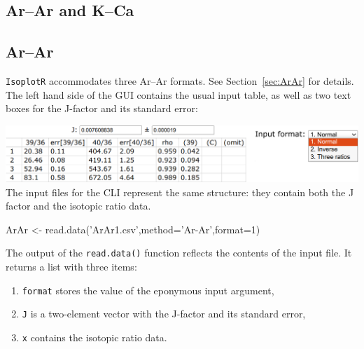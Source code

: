 \begin{refsection}

\chapter{Ar--Ar and K--Ca}
\label{ch:ArArKCa-R}

\section{Ar--Ar}\label{sec:ArAr-R}

\texttt{IsoplotR} accommodates three Ar--Ar formats. See
Section~\ref{sec:ArAr} for details. The left hand side of the GUI
contains the usual input table, as well as two text boxes for the
J-factor and its standard error:

\noindent\includegraphics[width=\linewidth]{../figures/ArArInputTableFormats.png}\\

The input files for the CLI represent the same structure: they contain
both the J factor and the isotopic ratio data.

\begin{console}
ArAr <- read.data('ArAr1.csv',method='Ar-Ar',format=1)
\end{console}

The output of the \texttt{read.data()} function reflects the contents
of the input file. It returns a list with three items:

\begin{enumerate}
\item\texttt{format} stores the value of the eponymous input argument,
\item\texttt{J} is a two-element vector with the J-factor and its standard error,
\item\texttt{x} contains the isotopic ratio data.
\end{enumerate}
  

\end{refsection}

